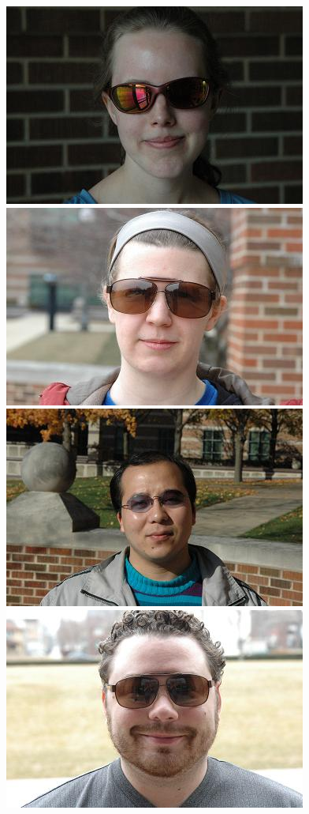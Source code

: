 \documentclass[12pt,journal,draftcls,letterpaper,onecolumn]{IEEEtran}
\begin{document}
\begin{figure}[t]
\includegraphics[scale=0.75,clip=true]{figures_pami/uiuc_example/sunglasses/DSC_4106.JPG}
\includegraphics[scale=0.75,clip=true]{figures_pami/uiuc_example/sunglasses/DSC_4126.JPG} \\
\vspace{2mm}
\centering
\includegraphics[scale=0.75,clip=true]{figures_pami/uiuc_example/sunglasses_failed/DSC_1611.JPG}
\includegraphics[scale=0.75,clip=true]{figures_pami/uiuc_example/sunglasses_failed/DSC_3528.JPG}

\end{figure}
\end{document}
